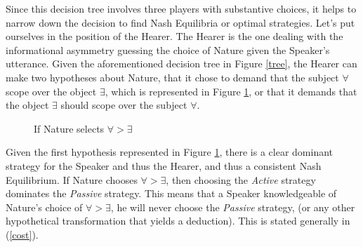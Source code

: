 \documentclass{article}
\begin{document}
Since this decision tree involves three players with substantive choices, it helps to narrow down the decision to find Nash Equilibria or optimal strategies. Let's put ourselves in the position of the Hearer. The Hearer is the one dealing with the informational asymmetry guessing the choice of Nature given the Speaker's utterance. Given the aforementioned decision tree in Figure \ref{tree}, the Hearer can make two hypotheses about Nature, that it chose to demand that the subject $\forall$ scope over the object $\exists$, which is represented in Figure \ref{all}, or that it demands that the object $\exists$ should scope over the subject $\forall$.

\begin{figure}
\centering
{}
\caption{If Nature selects $\forall>\exists$\label{all}}
\end{figure}

Given the first hypothesis represented in Figure \ref{all}, there is a clear dominant strategy for the Speaker and thus the Hearer, and thus a consistent Nash Equilibrium. If Nature chooses $\forall>\exists$, then choosing the \emph{Active} strategy dominates the \emph{Passive} strategy. This means that a Speaker knowledgeable of Nature's choice of $\forall>\exists$, he will never choose the \emph{Passive} strategy, (or any other hypothetical transformation that yields a deduction). This is  stated generally in (\ref{cost}).
\end{document}
